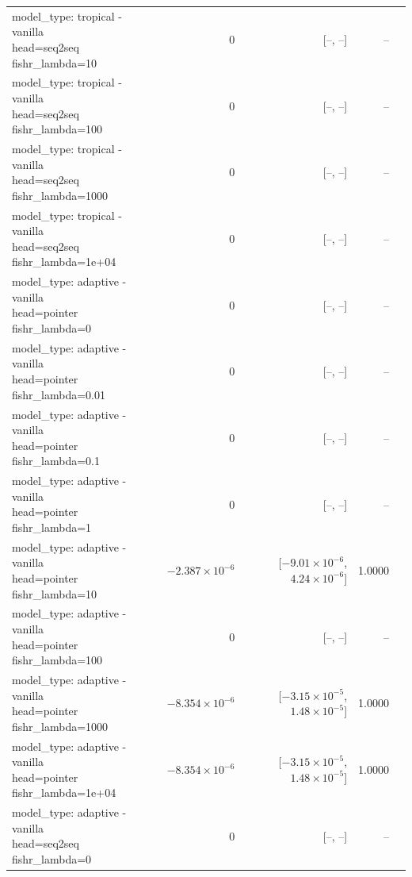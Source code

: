 \documentclass[10pt]{article}
\makeatletter
\newcommand{\stackcell}[1]{\begin{tabular}[t]{@{}l@{}}#1\end{tabular}}
\makeatother
\begin{document}
{\begin{longtable}{lrrrl}
\stackcell{model\_type: tropical - vanilla\\\footnotesize head=seq2seq fishr\_lambda=10 } & 0 & [--, --] & -- & \\
\stackcell{model\_type: tropical - vanilla\\\footnotesize head=seq2seq fishr\_lambda=100 } & 0 & [--, --] & -- & \\
\stackcell{model\_type: tropical - vanilla\\\footnotesize head=seq2seq fishr\_lambda=1000 } & 0 & [--, --] & -- & \\
\stackcell{model\_type: tropical - vanilla\\\footnotesize head=seq2seq fishr\_lambda=1e+04 } & 0 & [--, --] & -- & \\
\stackcell{model\_type: adaptive - vanilla\\\footnotesize head=pointer fishr\_lambda=0 } & 0 & [--, --] & -- & \\
\stackcell{model\_type: adaptive - vanilla\\\footnotesize head=pointer fishr\_lambda=0.01 } & 0 & [--, --] & -- & \\
\stackcell{model\_type: adaptive - vanilla\\\footnotesize head=pointer fishr\_lambda=0.1 } & 0 & [--, --] & -- & \\
\stackcell{model\_type: adaptive - vanilla\\\footnotesize head=pointer fishr\_lambda=1 } & 0 & [--, --] & -- & \\
\stackcell{model\_type: adaptive - vanilla\\\footnotesize head=pointer fishr\_lambda=10 } & $-2.387\times10^{-6}$ & [$-9.01\times10^{-6}$, $4.24\times10^{-6}$] & 1.0000 & \\
\stackcell{model\_type: adaptive - vanilla\\\footnotesize head=pointer fishr\_lambda=100 } & 0 & [--, --] & -- & \\
\stackcell{model\_type: adaptive - vanilla\\\footnotesize head=pointer fishr\_lambda=1000 } & $-8.354\times10^{-6}$ & [$-3.15\times10^{-5}$, $1.48\times10^{-5}$] & 1.0000 & \\
\stackcell{model\_type: adaptive - vanilla\\\footnotesize head=pointer fishr\_lambda=1e+04 } & $-8.354\times10^{-6}$ & [$-3.15\times10^{-5}$, $1.48\times10^{-5}$] & 1.0000 & \\
\stackcell{model\_type: adaptive - vanilla\\\footnotesize head=seq2seq fishr\_lambda=0 } & 0 & [--, --] & -- & \\

\end{longtable}}
\end{document}
